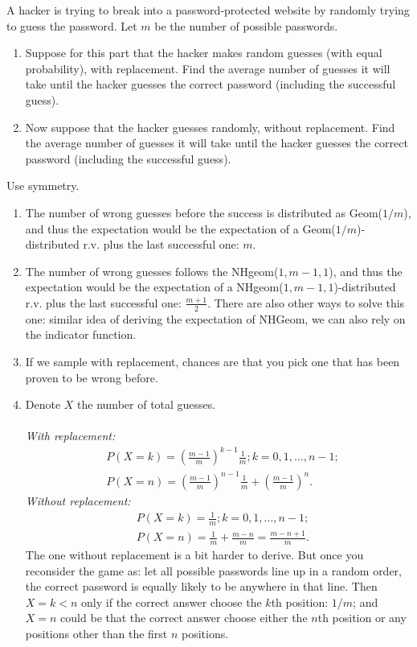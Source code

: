 
\setcounter{theorem}{78}
\begin{exercise} [BH.4.79] A hacker is trying to break into a password-protected website by randomly trying to guess the password. Let $m$ be the number of possible passwords.
	\begin{enumerate}
		\item Suppose for this part that the hacker makes random guesses (with equal probability), with replacement. Find the average number of guesses it will take until the hacker guesses the correct password (including the successful guess).
		\item Now suppose that the hacker guesses randomly, without replacement. Find the average number of guesses it will take until the hacker guesses the correct password (including the successful guess).
	\end{enumerate}
\begin{hint}
    Use symmetry.
\end{hint}
\begin{solution}\begin{enumerate}
    \item The number of wrong guesses before the success is distributed as Geom($1/m$), and thus the expectation would be the expectation of a Geom($1/m$)-distributed r.v. plus the last successful one: $m$.
    \item The number of wrong guesses follows the NHgeom($1,m-1,1$), and thus the expectation would be the expectation of a NHgeom($1,m-1,1$)-distributed r.v. plus the last successful one: $\frac{m+1}{2}$. There are also other ways to solve this one: similar idea of deriving the expectation of NHGeom, we can also rely on the indicator function. 
    \item If we sample with replacement, chances are that you pick one that has been proven to be wrong before.
    \item Denote $X$ the number of total guesses.\\~\\ 
    \textit{With replacement:}
    \begin{align*}
        & P(X=k)=\left(\frac{m-1}{m}\right)^{k-1} \frac{1}{m}; k=0,1,\dots,n-1;\\
        & P(X=n)=\left(\frac{m-1}{m}\right)^{n-1} \frac{1}{m}+\left(\frac{m-1}{m}\right)^{n}.
    \end{align*}
    \textit{Without replacement:}
    \begin{align*}
    & P(X=k)= \frac{1}{m}; k=0,1,\dots,n-1;\\
    & P(X=n)= \frac{1}{m}+\frac{m-n}{m}=\frac{m-n+1}{m}.
    \end{align*}
    The one without replacement is a bit harder to derive. But once you reconsider the game as: let all possible passwords line up in a random order, the correct password is equally likely to be anywhere in that line. Then $X=k<n$ only if the correct answer choose the $k$th position: $1/m$; and $X=n$ could be that the correct answer choose either the $n$th position or any positions other than the first $n$ positions.
\end{enumerate}
\end{solution}
\end{exercise}

